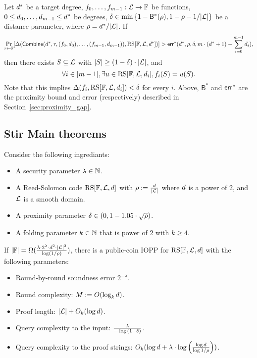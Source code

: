 \begin{lemma}\label{lemma:combine}
    Let $d^*$ be a target degree, $f_0,\ldots,f_{m-1}:\mathcal{L}\rightarrow\mathbb{F}$ be functions, $0\leq d_0,\ldots,d_{m-1}\leq d^*$ be degrees, $\delta\in\min{\{1-{\mathsf{B}}^*(\rho),1-\rho-1/|\mathcal{L}|\}}$ be a distance parameter, where $\rho=d^*/|\mathcal{L}|$. If
    \[
        \Pr_{r\gets\mathbb{F}}[\Delta(\mathsf{Combine}(d^*,r,(f_0,d_0),\ldots,(f_{m-1},d_{m-1})),\mathrm{RS}[\mathbb{F},\mathcal{L},d^*])]>\mathsf{err}^*(d^*,\rho,\delta,m\cdot(d^*+1)-\sum_{i=0}^{m-1}d_i),
    \] 
    then there exists $S\subseteq \mathcal{L}$ with $|S|\geq(1-\delta)\cdot|\mathcal{L}|$, and
    \[
        \forall i\in[m-1],\exists u\in\mathrm{RS}[\mathbb{F},\mathcal{L},d_i], f_i(S)=u(S).
    \]
    Note that this implies $\Delta(f_i,\mathrm{RS}[\mathbb{F},\mathcal{L},d_i])<\delta$ for every $i$. Above, ${\mathsf{B}}^*$ and ${\mathsf{err}}^*$ are the proximity bound and error (respectively) described in Section~\ref{sec:proximity_gap}.
\end{lemma}

\subsection{Stir Main theorems}

\begin{theorem}\label{thm:stir}
    Consider the following ingrediants:
    \begin{itemize}
        \item A security parameter $\lambda\in\mathbb{N}$.
        \item A Reed-Solomon code $\mathrm{RS}[\mathbb{F},\mathcal{L},d]$ with $\rho:=\frac{d}{|\mathcal{L}|}$ where $d$ is a power of $2$, and $\mathcal{L}$ is a smooth domain.
        \item A proximity parameter $\delta\in(0,1-1.05\cdot\sqrt{\rho})$.
        \item A folding parameter $k\in\mathbb{N}$ that is power of $2$ with $k\geq 4$.
    \end{itemize}
If $|\mathbb{F}|=\Omega(\frac{\lambda\cdot2^\lambda\cdot d^2\cdot{|\mathcal{L}|}^2}{\log(1/\rho)})$, there is a public-coin IOPP for $\mathrm{RS}[\mathbb{F},\mathcal{L},d]$ with the following parameters:
\begin{itemize}
    \item Round-by-round soundness error $2^{-\lambda}$.
    \item Round complexity: $M:=O(\log_k{d})$.
    \item Proof length: $|\mathcal{L}|+O_k(\log{d})$.
    \item Query complexity to the input: $\frac{\lambda}{-\log{(1-\delta)}}$.
    \item Query complexity to the proof strings: $O_k(\log{d}+\lambda\cdot\log{\Big(\frac{\log{d}}{\log{1/\rho}}\Big)})$.
\end{itemize}
\end{theorem}

